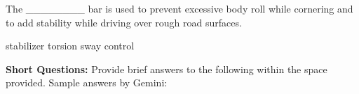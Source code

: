 \documentclass[12pt]{exam}
\begin{document}
\begin{questions}
                \question The \_\_\_\_\_\_\_\_ bar is used to prevent excessive body roll while cornering and to add stability while driving over rough road surfaces. \\
                \begin{oneparchoices} 
                    \choice stabilizer
                    \choice torsion
                    \choice sway
                    \choice control
                \end{oneparchoices}


                
		
			
		


            
        \end{questions}
        \setcounter{question}{0}
        \begin{center}

            \textbf{Short Questions:} Provide brief answers to the following within the space provided. Sample answers by Gemini:
        \end{center}
\end{document}
